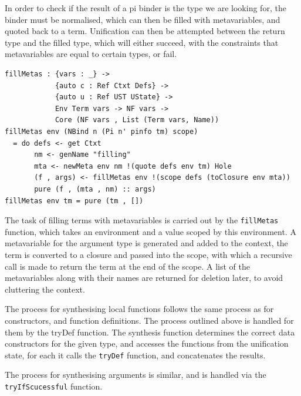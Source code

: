 \documentclass[a4paper]{article}
\begin{document}
In order to check if the result of a pi binder is the type we are
looking for, the binder must be normalised, which can then be filled
with metavariables, and quoted back to a term. Unification can then be
attempted between the return type and the filled type, which will
either succeed, with the constraints that metavariables are equal to
certain types, or fail.

\begin{center}
  \begin{verbatim}
fillMetas : {vars : _} -> 
            {auto c : Ref Ctxt Defs} ->
            {auto u : Ref UST UState} ->
            Env Term vars -> NF vars ->
            Core (NF vars , List (Term vars, Name))
fillMetas env (NBind n (Pi n' pinfo tm) scope) 
  = do defs <- get Ctxt 
       nm <- genName "filling"
       mta <- newMeta env nm !(quote defs env tm) Hole
       (f , args) <- fillMetas env !(scope defs (toClosure env mta))
       pure (f , (mta , nm) :: args)
fillMetas env tm = pure (tm , [])
  \end{verbatim}
\end{center}

The task of filling terms with metavariables is carried out by the
\texttt{fillMetas} function, which takes an environment and a value scoped
by this environment. A metavariable for the argument type is generated
and added to the context, the term is converted to a closure and passed
into the scope, with which a recursive call is made to return the
term at the end of the scope. A list of the metavariables along with
their names are returned for deletion later, to avoid cluttering the
context.

The process for synthesising local functions follows the
same process as for constructors, and function definitions. The process
outlined above is handled for them by the tryDef function. The
synthesis function determines the correct data constructors for the
given type, and accesses the functions from the unification state,
for each it calls the \texttt{tryDef} function, and concatenates the results.

The process for synthesising arguments is similar, and is handled via
the \texttt{tryIfScucessful} function.
\end{document}
